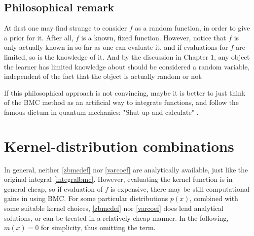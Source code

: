 \subsection{Philosophical remark}
At first one may find strange to consider $f$ as a random function, in order to give a prior for it. After all, $f$ is a known, fixed function. However, notice that $f$ is only actually known in so far as one can evaluate it, and if evaluations for $f$ are limited, so is the knowledge of it. And by the discussion in Chapter 1, any object the learner has limited knowledge about should be considered a random variable, independent of the fact that the object is actually random or not.

If this philosophical approach is not convincing, maybe it is better to just think of the BMC method as an artificial way to integrate functions, and follow the famous dictum in quantum mechanics: "Shut up and calculate" \cite{Mermin_2004}.


\section{Kernel-distribution combinations}\label{kerneldistributionbmc}
In general, neither \eqref{zbmcdef} nor \eqref{varcoef} are analytically available, just like the original integral \eqref{integralbmc}. However, evaluating the kernel function is in general cheap, so if evaluation of $f$ is expensive, there may be still computational gains in using BMC. For some particular distributions $p(x)$, combined with some suitable kernel choices, \eqref{zbmcdef} nor \eqref{varcoef} does lend analytical solutions, or can be treated in a relatively cheap manner. In the following, $m(x) = 0$ for simplicity, thus omitting the term.

